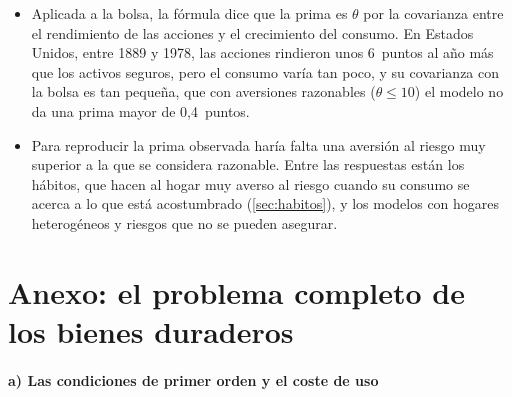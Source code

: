 \documentclass[11pt]{article}
\begin{document}
\begin{itemize}
\item Aplicada a la bolsa, la fórmula dice que la prima es $\theta$ por la covarianza entre el rendimiento de las acciones y el crecimiento del consumo. En Estados Unidos, entre 1889 y 1978, las acciones rindieron unos 6~puntos al año más que los activos seguros, pero el consumo varía tan poco, y su covarianza con la bolsa es tan pequeña, que con aversiones razonables ($\theta\leq 10$) el modelo no da una prima mayor de 0,4~puntos\nocite{MehraPrescott1985Equity}.
\item Para reproducir la prima observada haría falta una aversión al riesgo muy superior a la que se considera razonable. Entre las respuestas están los hábitos, que hacen al hogar muy averso al riesgo cuando su consumo se acerca a lo que está acostumbrado\nocite{CampbellCochrane1999Force} (\ref{sec:habitos}), y los modelos con hogares heterogéneos y riesgos que no se pueden asegurar.
\end{itemize}

\section{Anexo: el problema completo de los bienes duraderos}\label{anexo:duraderos}

\paragraph{a) Las condiciones de primer orden y el coste de uso}
\end{document}
